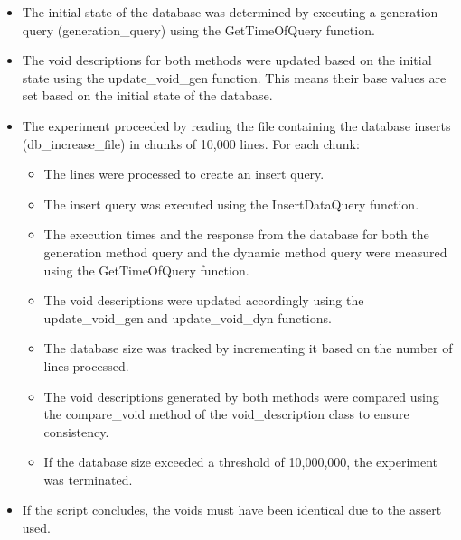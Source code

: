 \begin{itemize}
    \item The initial state of the database was determined by executing a generation query (generation\_query) using the GetTimeOfQuery function.
    
    \item The \gls{void} descriptions for both methods were updated based on the initial state using the update\_void\_gen function. This means their base values are set based on the initial state of the database.
    
    \item The experiment proceeded by reading the file containing the database inserts (db\_increase\_file) in chunks of 10,000 lines. For each chunk:
    
    \begin{itemize}
        \item The lines were processed to create an insert query.
        
        \item The insert query was executed using the InsertDataQuery function.
        
        \item The execution times and the response from the database for both the generation method query and the dynamic method query were measured using the GetTimeOfQuery function.
        
        \item The \gls{void} descriptions were updated accordingly using the update\_void\_gen and update\_void\_dyn functions.
        
        \item The database size was tracked by incrementing it based on the number of lines processed.
        
        \item The \gls{void} descriptions generated by both methods were compared using the compare\_void method of the \gls{void}\_description class to ensure consistency.
        
        \item If the database size exceeded a threshold of 10,000,000, the experiment was terminated.
    \end{itemize}
    
    \item If the script concludes, the \gls{void}s must have been identical due to the assert used.
\end{itemize}



